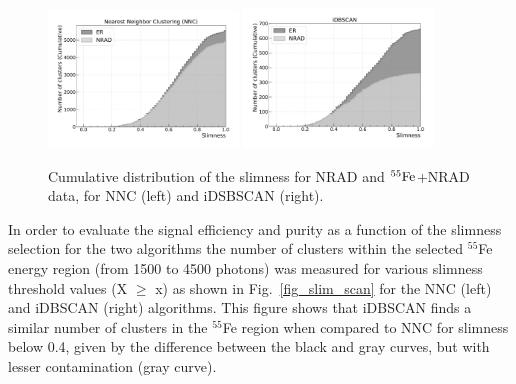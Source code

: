 \documentclass[a4paper,11pt]{article}
\begin{document}
\begin{figure}[ht]
\centering
\includegraphics[width=0.45\textwidth]{CDF_Slimness_2D.pdf}
\includegraphics[width=0.45\textwidth]{CDF_Slimness_3D.pdf}
\caption{Cumulative distribution of the slimness for NRAD and $\rm ^{55}Fe$+NRAD data, for NNC (left) and iDSBSCAN (right).} 
\label{fig_cdf_slim}
\end{figure}


In order to evaluate the signal efficiency and purity as a function of the slimness selection for the two algorithms
the number of clusters within the selected $^{55}$Fe energy region (from 1500 to 4500 photons) was measured for various slimness threshold values (X $\geqslant$ x) as shown in Fig.~\ref{fig_slim_scan} for the NNC (left) and iDBSCAN (right) algorithms.
This figure shows that iDBSCAN finds a similar number of clusters in the $^{55}$Fe region when compared to NNC for slimness below 0.4, given by the difference between the black and gray curves, but with lesser contamination (gray curve).
\end{document}
